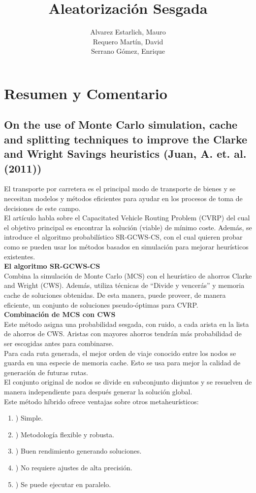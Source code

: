 \documentclass[11pt]{article} %
\title{Aleatorización Sesgada}
\author{Alvarez Estarlich, Mauro \\ Requero Martín, David \\ Serrano Gómez, Enrique}
\begin{document}
\maketitle

\section{Resumen y Comentario}

\subsection{On the use of Monte Carlo simulation, cache and splitting techniques to improve the Clarke and Wright Savings heuristics (Juan, A. et. al. (2011))}

El transporte por carretera es el principal modo de transporte de bienes y se necesitan modelos y métodos eficientes para ayudar en los procesos de toma de decisiones de este campo.\\[0.2cm]
El artículo habla sobre el Capacitated Vehicle Routing Problem (CVRP) del cual el objetivo principal es encontrar la solución (viable) de mínimo coste. Además, se introduce el algoritmo probabilístico SR-GCWS-CS, con el cual quieren probar como se pueden usar los métodos basados en simulación para mejorar heurísticos existentes.\\[0.2cm]
\textbf{El algoritmo SR-GCWS-CS}\\[0.2cm]
Combina la simulación de Monte Carlo (MCS) con el heurístico de ahorros Clarke and Wright (CWS). Además, utiliza técnicas de “Divide y vencerás” y memoria cache de soluciones obtenidas. De esta manera, puede proveer, de manera eficiente, un conjunto de soluciones pseudo-óptimas para CVRP. \\[0.2cm]
\textbf{Combinación de MCS con CWS}\\[0.2cm]
Este método asigna una probabilidad sesgada, con ruido, a cada arista en la lista de ahorros de CWS. Aristas con mayores ahorros tendrán más probabilidad de ser escogidas antes para combinarse.\\[0.2cm]
Para cada ruta generada, el mejor orden de viaje conocido entre los nodos se guarda en una especie de memoria cache. Esto se usa para mejor la calidad de generación de futuras rutas.\\[0.2cm]
El conjunto original de nodos se divide en subconjunto disjuntos y se resuelven de manera independiente para después generar la solución global.\\[0.2cm]
Este método híbrido ofrece ventajas sobre otros metaheurísticos:
\renewcommand{\labelenumi}{\alph{enumi}}
 \begin{enumerate}
   \item) Simple.
   \item) Metodología flexible y robusta.
   \item) Buen rendimiento generando soluciones.
   \item) No requiere ajustes de alta precisión.
   \item) Se puede ejecutar en paralelo.
 \end{enumerate}
\end{document}
